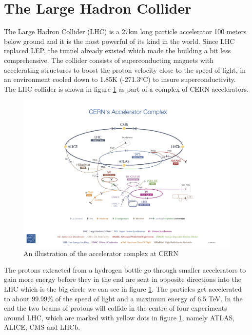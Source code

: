 \section{The Large Hadron Collider}
\label{sec:LHC}

The Large Hadron Collider (LHC) \cite{LHCcern} is a 27km long particle accelerator 100 meters below ground and it is the most powerful of its kind in the world. Since LHC replaced LEP, the tunnel already existed which made the building a bit less comprehensive. The collider consists of superconducting magnets with accelerating structures to boost the proton velocity close to the speed of light, in an environment cooled down to 1.85K (-271.3$^o$C) to insure superconductivity. The LHC collider is shown in figure \ref{fig:LHC} as part of a complex of CERN accelerators. 

\begin{figure}[H]
    \centering
    \includegraphics[width=\textwidth]{Figures/FromOnline/Poster-2013-377.jpg}
    \caption{An illustration of the accelerator complex at CERN \cite{LHCpic}}
    \label{fig:LHC}
\end{figure}

The protons extracted from a hydrogen bottle go through smaller accelerators to gain more energy before they in the end are sent in opposite directions into the LHC which is the big circle we can see in figure \ref{fig:LHC}. The particles get accelerated to about 99.99\% of the speed of light and a maximum energy of 6.5 TeV. In the end the two beams of protons will collide in the centre of four experiments around LHC, which are marked with yellow dots in figure \ref{fig:LHC}, namely ATLAS, ALICE, CMS and LHCb. 

